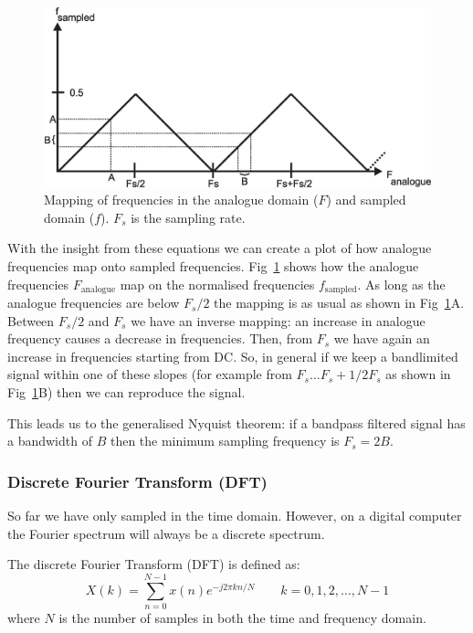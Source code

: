 \documentclass[12pt,a4paper]{article}
\begin{document}
\begin{figure}[!hbt]
\begin{center}
\mbox{\includegraphics[width=\textwidth]{fold_down}}
\end{center}
\caption{Mapping of frequencies in the analogue domain ($F$)
and sampled domain ($f$). $F_s$ is the sampling rate.
\label{fold_down}}
\end{figure}

With the insight from these equations we can create
a plot of how analogue frequencies map onto sampled frequencies.
Fig~\ref{fold_down} shows how the analogue frequencies $F_\textrm{analogue}$
map on the normalised frequencies $f_\textrm{sampled}$.
As long as the analogue frequencies are below $F_s/2$ the mapping
is as usual as shown in Fig~\ref{fold_down}A. 
Between $F_s/2$ and $F_s$ we have an inverse mapping:
an increase in analogue frequency causes a decrease in frequencies.
Then, from $F_s$ we have again an increase in frequencies starting
from DC. So,
in general if we keep a bandlimited signal within one of these
slopes (for example from $F_s \ldots F_s + 1/2 F_s$ as 
shown in Fig~\ref{fold_down}B) then we can
reproduce the signal.

This leads us to the generalised Nyquist theorem: if a bandpass
filtered signal has a bandwidth of $B$ then the minimum sampling
frequency is $F_s = 2B$.

\subsubsection{Discrete Fourier Transform (DFT)}
So far we have only sampled in the time domain. However, on
a digital computer the Fourier spectrum will always be a discrete
spectrum.

The discrete Fourier Transform (DFT) is defined as:
\begin{equation}
X(k) = \sum_{n=0}^{N-1} x(n) e^{-j2\pi kn / N} \qquad k=0,1,2, \ldots, N-1
\label{DFT}
\end{equation}
where $N$ is the number of samples in both the time and frequency domain.
\end{document}
